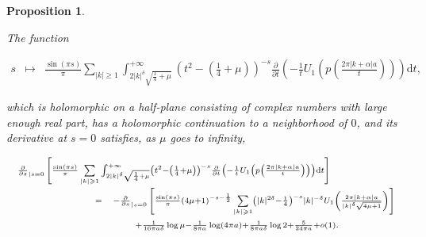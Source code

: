 \documentclass{jams-l}
\newtheorem{proposition}[theorem]{Proposition}
\theoremstyle{definition}
\theoremstyle{remark}
\numberwithin{equation}{section}
\begin{document}
                \begin{proposition}
                \label{PropMTilde4}
                
                    The function
                    
                    \[ \begin{array}{lll}
                            s & \longmapsto & \frac{\sin \left( \pi s \right)}{\pi} \sum\limits_{\left \vert k \right \vert \geqslant 1} \int_{2 \left \vert k \right \vert^{\delta} \sqrt{\frac{1}{4} + \mu}}^{+ \infty} \left( t^2 - \left( \frac{1}{4} + \mu \right) \right)^{-s} \frac{\partial}{\partial t} \left( - \frac{1}{t} U_1 \left( p \left( \frac{2 \pi \left \vert k + \alpha \right \vert a}{t} \right) \right) \right) \mathrm{d}t,
                        \end{array} \]
                    
                    \noindent which is holomorphic on a half-plane consisting of complex numbers with large enough real part, has a holomorphic continuation to a neighborhood of $0$, and its derivative at $s=0$ satisfies, as $\mu$ goes to infinity,
                    
                    \[ \begin{array}{lll}
                            \multicolumn{3}{l}{\scriptstyle \frac{\partial}{\partial s}_{\left \vert s = 0 \right.} \left[ \frac{\sin \left( \pi s \right)}{\pi} \sum\limits_{\left \vert k \right \vert \geqslant 1} \int_{2 \left \vert k \right \vert^{\delta} \sqrt{\frac{1}{4} + \mu}}^{+ \infty} \left( t^2 - \left( \frac{1}{4} + \mu \right) \right)^{-s} \frac{\partial}{\partial t} \left( - \frac{1}{t} U_1 \left( p \left( \frac{2 \pi \left \vert k + \alpha \right \vert a}{t} \right) \right) \right) \mathrm{d}t \right]} \\[1em]
                            
                            \qquad \qquad \qquad & \scriptstyle = & \scriptstyle - \frac{\partial}{\partial s}_{\left \vert s = 0 \right.} \left[ \frac{\sin \left( \pi s \right)}{\pi} \left( 4 \mu + 1 \right)^{-s-\frac{1}{2}} \sum\limits_{\left \vert k \right \vert \geqslant 1} \left( \left \vert k \right \vert^{2 \delta} - \frac{1}{4} \right)^{-s} \left \vert k \right \vert^{- \delta} U_1 \left( \frac{2 \pi \left \vert k + \alpha \right \vert a}{\left \vert k \right \vert^{\delta} \sqrt{4 \mu + 1}} \right) \right] \\[1em]
                            
                            && \qquad \scriptstyle + \frac{1}{16 \pi a \delta} \log \mu - \frac{1}{8 \pi a} \log \left( 4 \pi a \right) + \frac{1}{8 \pi a \delta} \log 2 + \frac{5}{24 \pi a} + o \left( 1 \right).
                        \end{array} \]
                    

\end{proposition}
\end{document}
